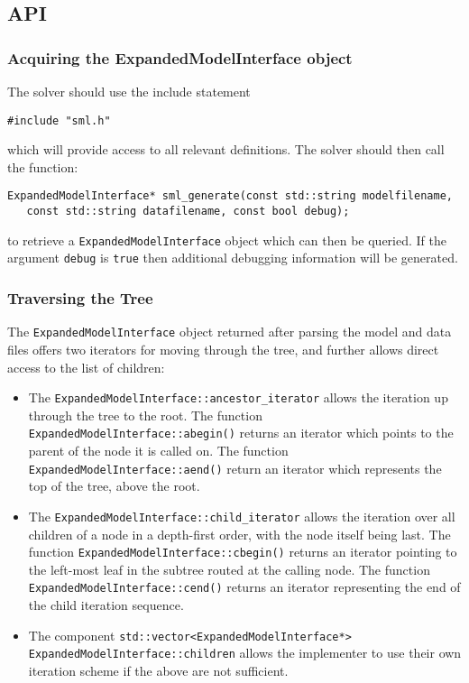 \documentclass[10pt,a4paper]{report}
\begin{document}
\subsection{API}

\subsubsection{Acquiring the ExpandedModelInterface object}
The solver should use the include statement
\begin{verbatim}
#include "sml.h"
\end{verbatim}
which will provide access to all relevant definitions. The solver should then
call the function:

\begin{verbatim}
ExpandedModelInterface* sml_generate(const std::string modelfilename, 
   const std::string datafilename, const bool debug);
\end{verbatim}
to retrieve a {\tt ExpandedModelInterface} object which can then be queried.
If the argument {\tt debug} is {\tt true} then additional debugging information
will be generated.

\subsubsection{Traversing the Tree}
The {\tt ExpandedModelInterface} object returned after parsing the model and
data files offers two iterators for moving through the tree, and further allows
direct access to the list of children:

\begin{itemize}
\item The {\tt ExpandedModelInterface::ancestor\_iterator} allows the iteration
up through the tree to the root. The function
{\tt ExpandedModelInterface::abegin()} returns an
iterator which points to the parent of the node it is called on. The function
{\tt ExpandedModelInterface::aend()} return an iterator which represents the
top of the tree, above the root.

\item The {\tt ExpandedModelInterface::child\_iterator} allows the iteration over all
children of a node in a depth-first order, with the node itself being last. The
function {\tt ExpandedModelInterface::cbegin()} returns an iterator pointing to
the left-most leaf in the subtree routed at the calling node. The function 
{\tt ExpandedModelInterface::cend()} returns an iterator representing the end
of the child iteration sequence.

\item The component
{\tt std::vector<ExpandedModelInterface*> ExpandedModelInterface::children}
allows the implementer to use their own iteration scheme if the above are not
sufficient.
\end{itemize}
\end{document}
